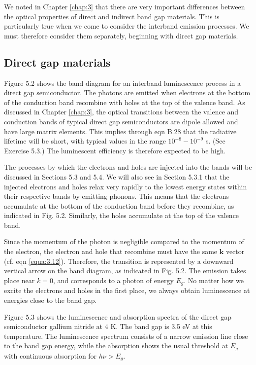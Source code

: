 \documentclass[12pt]{book}
\begin{document}
We noted in Chapter \ref{chap:3} that there are very important differences between the optical properties of direct and indirect band gap materials. This is particularly true when we come to consider the interband emission processes. We must therefore consider them separately, beginning with direct gap materials.
\subsection{Direct gap materials}
Figure 5.2 shows the band diagram for an interband luminescence process in a direct gap semiconductor. The photons are emitted when electrons at the bottom of the conduction band recombine with holes at the top of the valence band. As discussed in Chapter \ref{chap:3}, the optical transitions between the valence and conduction bands of typical direct gap semiconductors are dipole allowed and have large matrix elements. This implies through eqn B.28 that the radiative lifetime will be short, with typical values in the range $10^{-8}-10^{-9}$ s. (See Exercise 5.3.) The luminescent efficiency is therefore expected to be high.

The processes by which the electrons and holes are injected into the bands will be discussed in Sections 5.3 and 5.4. We will also see in Section 5.3.1 that the injected electrons and holes relax very rapidly to the lowest energy states within their respective bands by emitting phonons. This means that the electrons accumulate at the bottom of the conduction band before they recombine, as indicated in Fig. 5.2. Similarly, the holes accumulate at the top of the valence band.

Since the momentum of the photon is negligible compared to the momentum of the electron, the electron and hole that recombine must have the same $\mathbf{k}$ vector (cf. eqn \ref{equa:3.12}). Therefore, the transition is represented by a downward vertical arrow on the band diagram, as indicated in Fig. 5.2. The emission takes place near $k = 0$, and corresponds to a photon of energy $E_g$. No matter how we excite the electrons and holes in the first place, we always obtain luminescence at energies close to the band gap.

Figure 5.3 shows the luminescence and absorption spectra of the direct gap semiconductor gallium nitride at 4 K. The band gap is 3.5 eV at this temperature. The luminescence spectrum consists of a narrow emission line close to the band gap energy, while the absorption shows the usual threshold at $E_g$ with continuous absorption for $h\nu > E_g$.
\end{document}
